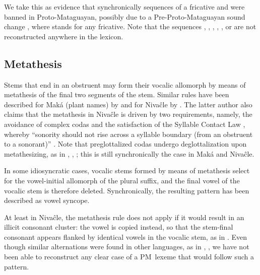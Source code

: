 \begin{exe}
    \ex \thread
    \ex \yicalhuk
    \ex \firewoodhuk
\end{exe}

We take this as evidence that synchronically sequences of a fricative and  were banned in Proto-Mataguayan, possibly due to a Pre-Proto-Mataguayan sound change , where  stands for any fricative. Note that the sequences , , , , , or  are not reconstructed anywhere in the lexicon.

\subsection{Metathesis}\label{metathesis}

Stems that end in an obstruent may form their vocalic allomorph by means of metathesis of the final two segments of the stem. Similar rules have been described for Maká (plant names) by \citet[74]{AG89} and for Nivaĉle by \citet[272–274]{AnG15}. The latter author also claims that the metathesis in Nivaĉle is driven by two requirements, namely, the avoidance of complex codas and the satisfaction of the Syllable Contact Law \citep{RMTV83}, whereby ``sonority should not rise across a syllable boundary (from an obstruent to a sonorant)'' \citep[295]{AnG20}. Note that preglottalized codas undergo deglottalization upon metathesizing, as in , , ; this is still synchronically the case in Maká and Nivaĉle.

\begin{exe}
    \ex \food
    \ex \wing
    \ex \fart \label{met-fart}
    \ex \leniosa
    \ex \grandchildmpl
    \ex \youngerbro
    \ex \bow
    \ex \nose \label{met-nose}
    \ex \abdcavity \label{met-abdcavity}
    \ex \trunk
\end{exe}

In some idiosyncratic cases, vocalic stems formed by means of metathesis select for the vowel-initial allomorph of the plural suffix, and the final vowel of the vocalic stem is therefore deleted. Synchronically, the resulting pattern has been described as vowel syncope.

\begin{exe}
    \ex \pathn
    \ex \burrow
\end{exe}

At least in Nivaĉle, the metathesis rule does not apply if it would result in an illicit consonant cluster: the vowel is copied instead, so that the stem-final consonant appears flanked by identical vowels in the vocalic stem, as in  \citep[277]{AnG15}. Even though similar alternations were found in other languages, as in  \citep[92]{JC14b},  \citep{JC18}, we have not been able to reconstruct any clear case of a PM~lexeme that would follow such a pattern.

